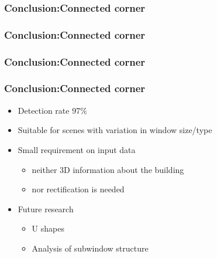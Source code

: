 \documentclass{beamer}
\begin{document}
\frame
{
}

\frame
{
	\frametitle{Conclusion:Connected corner}
}

\frame
{
	\frametitle{Conclusion:Connected corner}
}

\frame
{
	\frametitle{Conclusion:Connected corner}
}


\frame
{
	\frametitle{Conclusion:Connected corner}
	\begin{itemize}
	\item <+-| alert@+> Detection rate 97\%
	\item <+-| alert@+> Suitable for scenes with variation in window size/type
	\item <+-| alert@+> Small requirement on input data
		\begin{itemize}
		\item <+-| alert@+> neither 3D information about the building 
		\item <+-| alert@+> nor rectification is needed
		\end{itemize}
	\item <+-| alert@+> Future research
		\begin{itemize}			
		\item <+-| alert@+> U shapes 
		\item <+-| alert@+> Analysis of subwindow structure
		\end{itemize}			
	\end{itemize}
}
\end{document}
